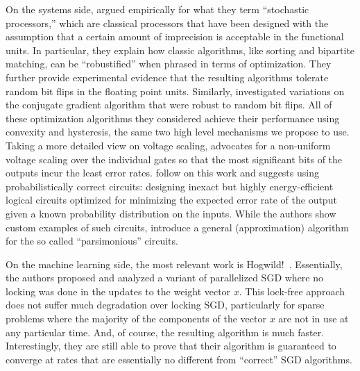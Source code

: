 \documentclass[12pt,leqno,twoside]{article}
\begin{document}
On the systems side, 
\citet{sartori11stochastic} argued empirically
for what they term ``stochastic processors,'' which are classical
processors that have been designed with the assumption that a certain
amount of imprecision is acceptable in the functional units. In particular, they explain how classic algorithms, like sorting and bipartite matching, can
be ``robustified'' when phrased in terms of optimization. They further 
provide experimental evidence that the resulting algorithms tolerate 
random bit flips in the floating point units. Similarly, \citet{oberil11numerical} investigated variations on the conjugate gradient algorithm that
were robust to random bit flips. All of these optimization algorithms
they considered achieve their performance using convexity and
hysteresis, the same two high level mechanisms we propose to use. Taking a more detailed view on voltage scaling, \citep{Charkrapani2008} advocates for a non-uniform voltage scaling over the individual gates so that the most significant bits of the outputs incur the least error rates. \citep{palem2009} follow on this work and suggests using probabilistically correct circuits: designing inexact but highly energy-efficient logical circuits optimized for minimizing the expected error rate of the output given a known probability distribution on the inputs. While the authors show custom examples of such circuits, \citet{Lingamneni2011} introduce a general (approximation) algorithm for the so called ``parsimonious'' circuits.

On the machine learning side, the most relevant work is
Hogwild!~\citep{niu11hogwild}. Essentially, the authors proposed
and analyzed a variant of parallelized SGD where no locking was
done in the updates to the weight vector $x$. This lock-free approach
does not suffer much degradation over locking SGD,  particularly
for sparse problems where the majority of the components of the
vector $x$ are not in use at any particular time. And, of course,
the resulting algorithm is much faster.  Interestingly, they are
still able to prove that their algorithm is guaranteed to converge
at rates that are essentially no different from ``correct'' SGD
algorithms.



 
\end{document}

